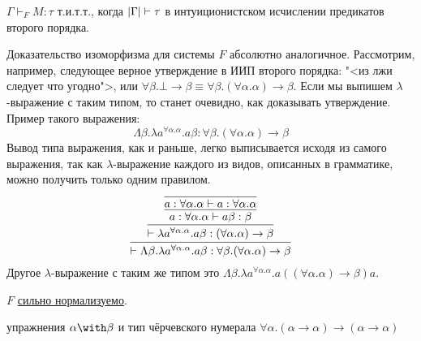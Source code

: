 \begin{theorem}
    $\Gamma \vdash_F M :\tau$ т.и.т.т., когда $\left|\Gamma\right| \vdash \tau$ в интуиционистском исчислении предикатов второго порядка.
\end{theorem}

Доказательство изоморфизма для системы $F$ абсолютно аналогичное.
Рассмотрим, например, следующее верное утверждение в ИИП второго порядка: "<из лжи следует что угодно">, или
$\forall \beta . \bot \to \beta \equiv \forall \beta . (\forall \alpha.\alpha) \to \beta$.
Если мы выпишем $\lambda$-выражение с таким типом, то станет очевидно, как доказывать утверждение. Пример такого выражения:
\[
    \Lambda \beta . \lambda a^{\forall \alpha.\alpha} . a \beta :
    \forall \beta . (\forall \alpha.\alpha) \to \beta
\]
Вывод типа выражения, как и раньше, легко выписывается исходя из самого выражения,
так как $\lambda$-выражение каждого из видов, описанных в грамматике, можно получить только одним правилом.
\[
    \infer{\vdash \Lambda \beta . \lambda a^{\forall \alpha.\alpha} . a \beta : \forall \beta . (\forall \alpha.\alpha) \to \beta}
    {   \infer{\vdash \lambda a^{\forall \alpha.\alpha} . a \beta : (\forall \alpha.\alpha) \to \beta}
        {   \infer{a : \forall \alpha . \alpha \vdash a \beta : \beta}
            {   \infer{a : \forall \alpha.\alpha \vdash a : \forall \alpha.\alpha}{}
            }
        }
    }
\]
Другое $\lambda$-выражение с таким же типом это
$\Lambda \beta . \lambda a^{\forall \alpha . \alpha} . a ((\forall \alpha.\alpha) \to \beta) a$.

\begin{theorem}
    $F$ \hyperref[strong-normalization]{сильно нормализуемо}.
\end{theorem}

\todo упражнения $\alpha\with\beta$ и тип чёрчевского нумерала
$\forall\alpha.(\alpha\to\alpha)\to(\alpha\to\alpha)$
